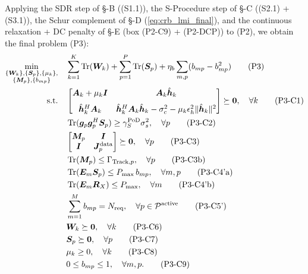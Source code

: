 Applying the SDR step of \S-B ((S1.1)), the S-Procedure step of \S-C ((S2.1) + (S3.1)), the Schur complement of \S-D (\eqref{eq:crb_lmi_final}), and the continuous relaxation + DC penalty of \S-E (box (P2-C9) + (P2-DCP)) to (P2), we obtain the final problem (P3):
\begin{align}
\min_{\substack{\{\bm{W}_k\}, \{\bm{S}_p\}, \{\mu_k\}, \\ \{\bm{M}_p\}, \{b_{mp}\}}} \quad
& \sum_{k=1}^K \operatorname{Tr}(\bm{W}_k) + \sum_{p=1}^P \operatorname{Tr}(\bm{S}_p) + \eta_b \sum_{m, p} (b_{mp} - b_{mp}^2) \tag{P3} \\
\text{s.t.} \quad
& \begin{bmatrix} \bm{A}_k + \mu_k \bm{I} & \bm{A}_k \hat{\bm{h}}_k \\[1.5ex] \hat{\bm{h}}_k^H \bm{A}_k & \hat{\bm{h}}_k^H \bm{A}_k \hat{\bm{h}}_k - \sigma_c^2 - \mu_k \epsilon_h^2 \|\hat{\bm{h}}_k\|^2 \end{bmatrix} \succeq \bm{0}, \quad \forall k \tag{P3-C1} \label{eq:p3c1} \\
& \operatorname{Tr}(\bm{g}_p \bm{g}_p^H \bm{S}_p) \geq \gamma_S^{\text{PoD}} \sigma_s^2, \quad \forall p \tag{P3-C2} \label{eq:p3c2} \\
& \begin{bmatrix} \bm{M}_p & \bm{I} \\ \bm{I} & \bm{J}_p^{\text{data}} \end{bmatrix} \succeq \bm{0}, \quad \forall p \tag{P3-C3} \label{eq:p3c3} \\
& \operatorname{Tr}(\bm{M}_p) \leq \Gamma_{\text{Track},p}, \quad \forall p \tag{P3-C3b} \label{eq:p3c3b} \\
& \operatorname{Tr}(\bm{E}_m \bm{S}_p) \leq P_{\max} \, b_{mp}, \quad \forall m, p \tag{P3-C4'a} \label{eq:p3c4a} \\
& \operatorname{Tr}(\bm{E}_m \bm{R}_X) \leq P_{\max}, \quad \forall m \tag{P3-C4'b} \label{eq:p3c4b} \\
& \sum_{m=1}^{M} b_{mp} = N_{\text{req}}, \quad \forall p \in \mathcal{P}^{\text{active}} \tag{P3-C5'} \label{eq:p3c5} \\
& \bm{W}_k \succeq \bm{0}, \quad \forall k \tag{P3-C6} \label{eq:p3c6} \\
& \bm{S}_p \succeq \bm{0}, \quad \forall p \tag{P3-C7} \label{eq:p3c7} \\
& \mu_k \geq 0, \quad \forall k \tag{P3-C8} \label{eq:p3c8} \\
& 0 \leq b_{mp} \leq 1, \quad \forall m, p. \tag{P3-C9} \label{eq:p3c9}
\end{align}
